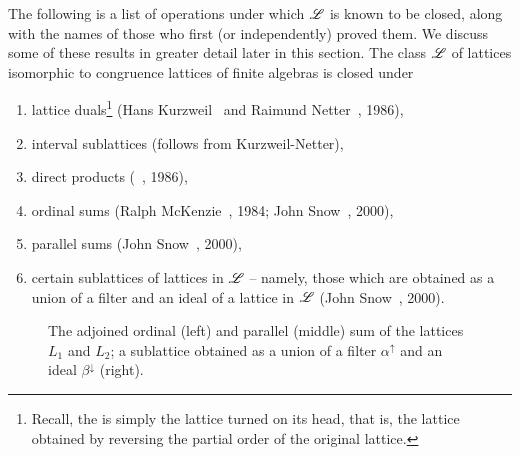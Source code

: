The following is a list of operations under which $\mathscr{L}$ is known to be closed,
along with the names of those who first (or independently) proved them.  We
discuss some of these results in greater detail later in this section.
The class $\mathscr{L}$ of lattices isomorphic to congruence lattices of finite
algebras is closed under 
\begin{enumerate} %
\item lattice duals\footnote{Recall, the  is simply the
  lattice turned on its head, that is, the lattice obtained by
  reversing the partial order of the original lattice.}  (Hans
  Kurzweil~\cite{Kurzweil:1985} and Raimund Netter~\cite{Netter:1986}, 1986),
\item interval sublattices (follows from Kurzweil-Netter),
\item  direct products (\Jiri \Tuma~\cite{Tuma:1986}, 1986), 
\item  ordinal sums 
  (Ralph McKenzie~\cite{McKenzie:1984}, 1984; John Snow~\cite{Snow:2000}, 2000),
\item  parallel sums (John Snow~\cite{Snow:2000}, 2000), 
\item certain sublattices of lattices in $\mathscr{L}$ -- namely, those which
  are obtained as a union of a filter and an ideal of a lattice in
  $\mathscr{L}$ (John Snow~\cite{Snow:2000}, 2000). 
\end{enumerate}
\begin{center}
  \begin{figure}[h!]
    \label{fig:ordinal-and-parallel}
    \centering
    \hskip5mm
    \hskip5mm
    \caption{The adjoined ordinal (left) and parallel (middle) sum of the lattices
      $L_1$ and $L_2$; a sublattice obtained as a union of a filter
      $\alpha^\uparrow $ and an ideal $\beta^\downarrow$ (right).}
  \end{figure}
\end{center}

